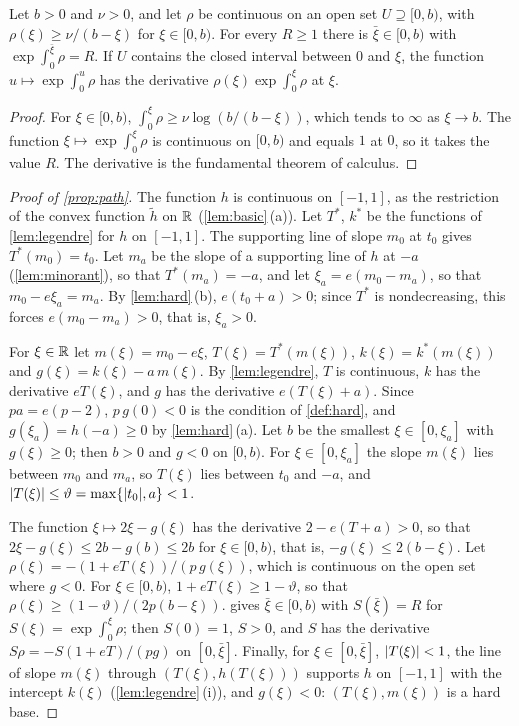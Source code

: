 \begin{lemma}\label{lem:quadrature}
Let $b>0$ and $\nu>0$, and let $\rho$ be continuous on an open set $U\supseteq[0,b)$, with
$\rho(\xi)\ge\nu/(b-\xi)$ for $\xi\in[0,b)$. For every $R\ge1$ there is $\bar\xi\in[0,b)$ with
$\exp\int_0^{\bar\xi}\rho=R$. If $U$ contains the closed interval between $0$ and $\xi$, the
function $u\mapsto\exp\int_0^u\rho$ has the derivative $\rho(\xi)\exp\int_0^\xi\rho$ at $\xi$.
\end{lemma}

\begin{proof}
For $\xi\in[0,b)$, $\int_0^\xi\rho\ge\nu\log(b/(b-\xi))$, which tends to $\infty$ as
$\xi\to b$. The function $\xi\mapsto\exp\int_0^\xi\rho$ is continuous on $[0,b)$ and equals $1$
at $0$, so it takes the value $R$. The derivative is the fundamental theorem of calculus.
\end{proof}

\begin{proof}[Proof of \cref{prop:path}]
The function $h$ is continuous on $[-1,1]$, as the restriction of the convex function $\tilde h$
on $\mathbb{R}$ (\cref{lem:basic}\,(a)). Let $T^\ast$, $k^\ast$ be the functions of
\cref{lem:legendre} for $h$ on $[-1,1]$. The supporting line of slope $m_0$ at $t_0$ gives
$T^\ast(m_0)=t_0$. Let $m_a$ be the slope of a supporting line of $h$ at $-a$
(\cref{lem:minorant}), so that $T^\ast(m_a)=-a$, and let $\xi_a=e(m_0-m_a)$, so that
$m_0-e\xi_a=m_a$. By \cref{lem:hard}\,(b), $e(t_0+a)>0$; since $T^\ast$ is nondecreasing, this
forces $e(m_0-m_a)>0$, that is, $\xi_a>0$.

For $\xi\in\mathbb{R}$ let $m(\xi)=m_0-e\xi$, $T(\xi)=T^\ast(m(\xi))$, $k(\xi)=k^\ast(m(\xi))$ and
$g(\xi)=k(\xi)-a\,m(\xi)$. By \cref{lem:legendre}, $T$ is continuous, $k$ has the derivative
$eT(\xi)$, and $g$ has the derivative $e(T(\xi)+a)$. Since $pa=e(p-2)$, $p\,g(0)<0$ is the
condition of \cref{def:hard}, and $g(\xi_a)=h(-a)\ge0$ by \cref{lem:hard}\,(a). Let $b$ be the
smallest $\xi\in[0,\xi_a]$ with $g(\xi)\ge0$; then $b>0$ and $g<0$ on $[0,b)$. For
$\xi\in[0,\xi_a]$ the slope $m(\xi)$ lies between $m_0$ and $m_a$, so $T(\xi)$ lies between
$t_0$ and $-a$, and $\lvert T(\xi)\rvert\le\vartheta=\max\{\lvert t_0\rvert,a\}<1$.

The function $\xi\mapsto2\xi-g(\xi)$ has the derivative $2-e(T+a)>0$, so that
$2\xi-g(\xi)\le2b-g(b)\le2b$ for $\xi\in[0,b)$, that is, $-g(\xi)\le2(b-\xi)$. Let
$\rho(\xi)=-(1+eT(\xi))/(p\,g(\xi))$, which is continuous on the open set where $g<0$. For
$\xi\in[0,b)$, $1+eT(\xi)\ge1-\vartheta$, so that $\rho(\xi)\ge(1-\vartheta)/(2p(b-\xi))$.
 gives $\bar\xi\in[0,b)$ with $S(\bar\xi)=R$ for
$S(\xi)=\exp\int_0^\xi\rho$; then $S(0)=1$, $S>0$, and $S$ has the derivative
$S\rho=-S(1+eT)/(pg)$ on $[0,\bar\xi]$. Finally, for $\xi\in[0,\bar\xi]$, $\lvert T(\xi)\rvert<1$, the
line of slope $m(\xi)$ through $(T(\xi),h(T(\xi)))$ supports $h$ on $[-1,1]$ with the intercept
$k(\xi)$ (\cref{lem:legendre}\,(i)), and $g(\xi)<0$: $(T(\xi),m(\xi))$ is a hard base.
\end{proof}

